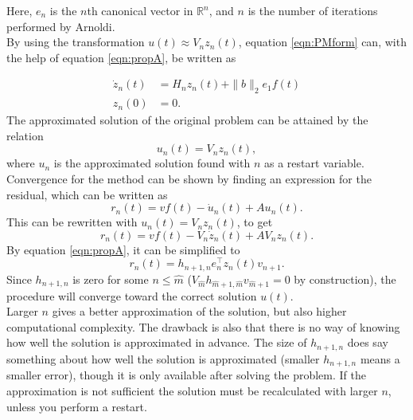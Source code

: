 \noindent Here, $e_n$ is the $n$th canonical vector in $\mathbb{R}^n$, and $n$ is the number of iterations performed by Arnoldi.\\

\noindent By using the transformation $u(t) \approx V_n z_n(t)$, equation \eqref{eqn:PMform} can, with the help of equation \eqref{eqn:propA}, be written as

\begin{equation}
\begin{aligned}
\dot{z}_n(t) &= H_n z_n(t) + \| b\|_2 e_1 f(t)  \\
z_n(0) &= 0.
\label{eqn:KPMi}
\end{aligned}
\end{equation}
The approximated solution of the original problem can be attained by the relation
\begin{equation*}
u_n(t) = V_n z_n(t),
\end{equation*}
where $u_n$ is the approximated solution found with $n$ as a restart variable. \\

\noindent Convergence for the method can be shown by finding an expression for the residual, which can be written as
\begin{equation*}
r_n(t) = v f(t) -\dot{u}_n(t) + A u_n(t).
\end{equation*}
This can be rewritten with $u_n(t) = V_n z_n(t)$, to get
\begin{equation*}
r_n(t) = v f(t) - V_n \dot{z}_n(t) + A V_n z_n(t).
\end{equation*}
By equation \eqref{eqn:propA}, it can be simplified to
\begin{equation}
r_n(t) = h_{n+1,n} e_n^\top z_n(t) v_{n+1}.
\label{eqn:Aresidual}
\end{equation}
\noindent Since $h_{n+1,n}$ is zero for some $n \leq \hat{m}$ ($V_{\hat{m}} h_{\hat{m}+1,\hat{m}} v_{\hat{m}+1} = 0 $ by construction), the procedure will converge toward the correct solution $u(t)$. \\

\noindent Larger $n$ gives a better approximation of the solution, but also higher computational complexity. The drawback is also that there is no way of knowing how well the solution is approximated in advance. The size of $h_{n+1,n}$ does say something about how well the solution is approximated (smaller $h_{n+1,n}$ means a smaller error), though it is only available after solving the problem. If the approximation is not sufficient the solution must be recalculated with larger $n$, unless you perform a restart. \\

